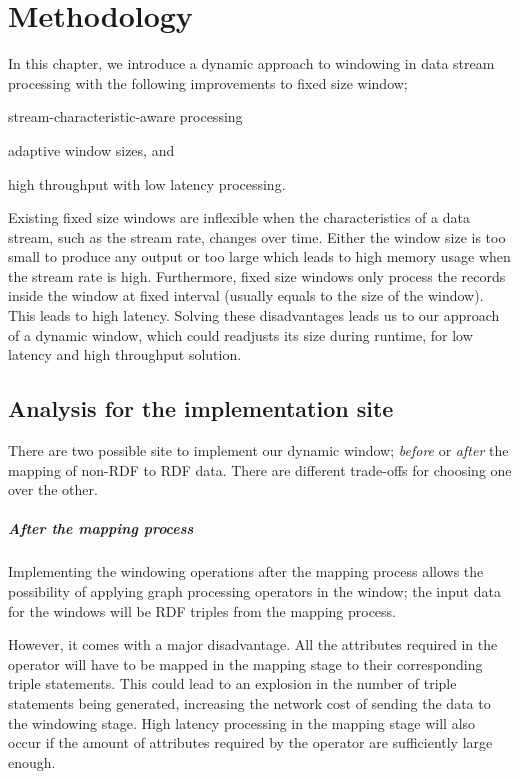 \chapter{Methodology}%
\label{chap:Methodology}


In this chapter, we introduce a dynamic approach to windowing in data stream processing 
with the following improvements to fixed size window; 
\begin{enumerate*}[label=(\alph*)]
    \item stream-characteristic-aware processing 
    \item adaptive window sizes, and 
    \item high throughput with low latency processing. 
\end{enumerate*}

Existing fixed size windows are inflexible when the characteristics of a data stream,  
such as the stream rate, changes over time. Either the window size is 
too small to produce any output or too large which leads to high memory usage when 
the stream rate is high. Furthermore, fixed size windows only process the 
records inside the window at fixed interval (usually equals to the size of the window). 
This leads to high latency. Solving these disadvantages leads us to our approach 
of a dynamic window, which could readjusts its size during runtime,
for low latency and high throughput solution. 





\section{Analysis for the implementation site}
\label{sec:analysis implementation site}
There are two possible site to implement our dynamic window; 
\emph{before} or \emph{after} the mapping of non-RDF to RDF data. There are different trade-offs for choosing one 
over the other. 

\paragraph{After the mapping process}%
Implementing the windowing operations after the mapping process allows the 
possibility of applying graph processing operators in the window; the input data for 
the windows will be RDF triples from the mapping process. 

However, it comes with a major disadvantage. All the attributes required in the operator 
will have to be mapped in the mapping stage to their corresponding triple statements. 
This could lead to an explosion in the number of triple statements being generated, increasing 
the network cost of sending the data to the windowing stage. High latency processing in 
the mapping stage will also occur if the amount of attributes required by 
the operator are sufficiently large enough. 


